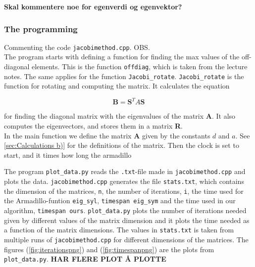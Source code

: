 \documentclass{article}
\begin{document}

\textbf{Skal kommentere noe for egenverdi og egenvektor?}

  \subsubsection{The programming}

Commenting the code \texttt{jacobimethod.cpp}.  OBS. \\

The program starts with defining a function for finding the max values of the off-diagonal elements. This is the function \texttt{offdiag}, which is taken from the lecture notes. The same applies for the function \texttt{Jacobi\_rotate}. \texttt{Jacobi\_rotate} is the function for rotating and computing the matrix. It calculates the equation

\begin{equation*}
    \textbf{B} = \textbf{S}^T A \textbf{S}
\end{equation*}

for finding the diagonal matrix with the eigenvalues of the matrix \textbf{A}. It also computes the eigenvectors, and stores them in a matrix \textbf{R}. \\

In the main function we define the matrix \textbf{A} given by the constants $d$ and $a$. See \ref{sec:Calculations b)} for the definitions of the matrix. Then the clock is set to start, and it times how long the armadillo \\

\vspace{2cm}

The program \texttt{plot\_data.py} reads the \texttt{.txt}-file made in \texttt{jacobimethod.cpp} and plots the data. \texttt{jacobimethod.cpp} generates the file \texttt{stats.txt}, which contains the dimension of the matrices, \texttt{n}, the number of iterations, \texttt{i}, the time used for the Armadillo-funtion \texttt{eig\_syl}, \texttt{timespan eig\_sym} and the time used in our algorithm, \texttt{timespan ours}.
\texttt{plot\_data.py} plots the number of iterations needed given by different values of the matrix dimension and it plots the time needed as a function of the matrix dimensions. The values in \texttt{stats.txt} is taken from multiple runs of \texttt{jacobimethod.cpp} for different dimensions of the matrices. The figures (\ref{fig:iterationspng}) and (\ref{fig:timespanpng}) are the plots from \texttt{plot\_data.py}. \textbf{HAR FLERE PLOT Å PLOTTE} \\ 
\end{document}
